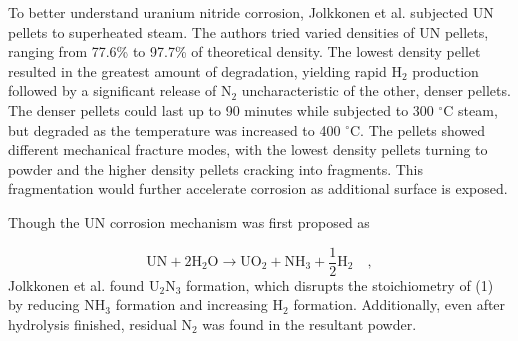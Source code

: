 \documentclass[11pt]{article}
\begin{document}
\par 
To better understand uranium nitride corrosion, Jolkkonen et al. \cite{Jolkkonen2017} subjected UN pellets to superheated steam. The authors tried varied densities of UN pellets, ranging from 77.6\% to 97.7\% of theoretical density. The lowest density pellet resulted in the greatest amount of degradation, yielding rapid H$_{2}$ production followed by a significant release of N$_{2}$ uncharacteristic of the other, denser pellets. The denser pellets could last up to 90 minutes while subjected to 300 $^{\circ}$C steam, but degraded as the temperature was increased to 400 $^{\circ}$C. The pellets showed different mechanical fracture modes, with the lowest density pellets turning to powder and the higher density pellets cracking into fragments. This fragmentation would further accelerate corrosion as additional surface is exposed.
\par 
Though the UN corrosion mechanism was first proposed as 

\begin{equation}
\mbox{UN} + 2\mbox{H}_{2}\mbox{O} \rightarrow \mbox{UO}_{2} + \mbox{NH}_{3} + \frac{1}{2} \mbox{H}_{2} \quad ,
\end{equation}
Jolkkonen et al. found U$_{2}$N$_{3}$ formation, which disrupts the stoichiometry of (1) by reducing NH$_{3}$ formation and increasing H$_{2}$ formation. Additionally, even after hydrolysis finished, residual N$_{2}$ was found in the resultant powder.
\end{document}
